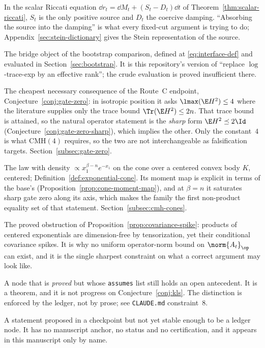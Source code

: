 \documentclass[../../main.tex]{subfiles}
\begin{document}
\begin{description}[leftmargin=0pt,style=nextline,itemsep=0.35em]
  \item[Stein source, Riccati source and damping.] In the scalar Riccati equation
  $\dd r_t=\dd M_t+(S_t-D_t)\dd t$ of Theorem~\ref{thm:scalar-riccati}, $S_t$ is the only
  positive source and $D_t$ the coercive damping. ``Absorbing the source into the damping''
  is what every fixed-cut argument is trying to do; Appendix~\ref{sec:stein-dictionary}
  gives the Stein representation of the source.

  \item[Interface functional $\Xi_T(\mu)$.] The bridge object of the bootstrap comparison,
  defined at \eqref{eq:interface-def} and evaluated in Section~\ref{sec:bootstrap}. It is
  this repository's version of ``replace $\log$-trace-exp by an effective rank''; the crude
  evaluation is proved insufficient there.

  \item[Gate zero, and sharp gate zero.] The cheapest necessary consequence of the Route~C
  endpoint, Conjecture~\ref{conj:gate-zero}: in isotropic position it asks
  $\lmax(\E H^2)\le4$ where the literature supplies only the trace bound
  $\Tr(\E H^2)\le2n$. That trace bound is attained, so the natural operator statement is the
  \emph{sharp} form $\E H^2\preceq2\Id$ (Conjecture~\ref{conj:gate-zero-sharp}), which implies
  the other. Only the constant~$4$ is what $\mathrm{CMH}(4)$ requires, so the two are not
  interchangeable as falsification targets. Section~\ref{subsec:gate-zero}.

  \item[Exponential cone measure $\bar\mu_{K,\beta}$.] The law with density
  $\propto x_1^{\beta-n}e^{-x_1}$ on the cone over a centered convex body $K$, centered;
  Definition~\ref{def:exponential-cone}. Its moment map is explicit in terms of the base's
  (Proposition~\ref{prop:cone-moment-map}), and at $\beta=n$ it saturates sharp gate zero along
  its axis, which makes the family the first non-product equality set of that statement.
  Section~\ref{subsec:cmh-cones}.

  \item[Covariance spike.] The proved obstruction of
  Proposition~\ref{prop:covariance-spike}: products of centered exponentials are
  dimension-free by tensorization, yet their conditional covariance spikes. It is why no
  uniform operator-norm bound on $\norm{A_t}_\op$ can exist, and it is the single sharpest
  constraint on what a correct argument may look like.

  \item[Applicability-blocked.] A node that is \emph{proved} but whose \texttt{assumes} list
  still holds an open antecedent. It is a theorem, and it is not progress on
  Conjecture~\ref{conj:kls}. The distinction is enforced by the ledger, not by prose; see
  \texttt{CLAUDE.md} constraint~8.

  \item[Candidate (\texttt{cand:}).] A statement proposed in a checkpoint but not yet stable
  enough to be a ledger node. It has no manuscript anchor, no status and no certification,
  and it appears in this manuscript only by name.
\end{description}
\end{document}
